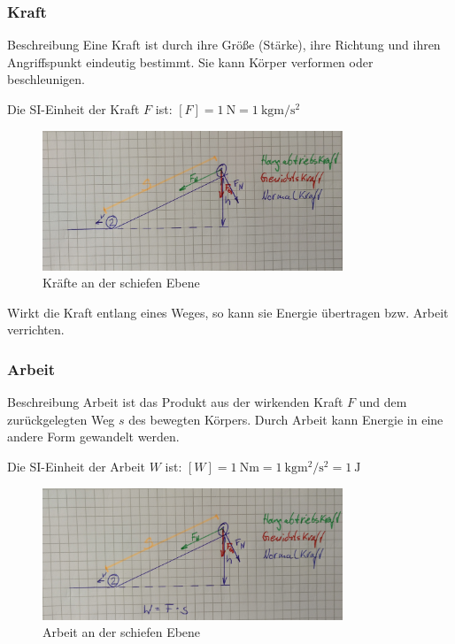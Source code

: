 \documentclass{article}
\begin{document}
\frame
{
  \frametitle{Kraft}
\begin{block}{Beschreibung}
Eine Kraft ist durch ihre Größe (Stärke), ihre Richtung und ihren Angriffspunkt eindeutig bestimmt. Sie kann Körper verformen oder beschleunigen.
\end{block}
Die SI-Einheit der Kraft $F$ ist:
$[F]=\SI{1}{\newton}=\SI{1}{\kilo\gram\meter\per\square\second}$
      \begin{figure}
	  \includegraphics[width=0.8\textwidth]{Kraft}
	  \vspace{-3mm}
	  \caption{Kräfte an der schiefen Ebene}
   \end{figure}
     Wirkt die Kraft entlang eines Weges, so kann sie Energie übertragen bzw. Arbeit verrichten.
}

\frame
{
  \frametitle{Arbeit}
\begin{block}{Beschreibung}
Arbeit ist das Produkt aus der wirkenden Kraft $F$ und dem zurückgelegten Weg $s$ des bewegten Körpers. Durch Arbeit kann Energie in eine andere Form gewandelt werden.
\end{block}
Die SI-Einheit der Arbeit $W$ ist:
$[W]=\SI{1}{\newton\meter}=\SI{1}{\kilo\gram\square\meter\per\square\second}=\SI{1}{\joule}$
      \begin{figure}
	  \includegraphics[width=0.8\textwidth]{Arbeit_1}
	  \vspace{-3mm}
	  \caption{Arbeit an der schiefen Ebene}
   \end{figure}
}
\end{document}
